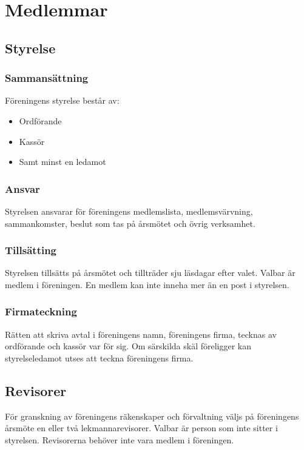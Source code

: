 \section{Medlemmar}

\subsection{Styrelse} \label{sec:sammansättning-styrelse}

\subsubsection{Sammansättning} 
Föreningens styrelse består av:
\begin{itemize}
    \item Ordförande
    \item Kassör
    \item Samt minst en ledamot
\end{itemize}

\subsubsection{Ansvar}
Styrelsen ansvarar för föreningens medlemslista, medlemsvärvning, sammankomster, beslut som tas på årsmötet och övrig verksamhet.

\subsubsection{Tillsätting}
Styrelsen tillsätts på årsmötet och tillträder sju läsdagar efter valet. Valbar är medlem i föreningen. En medlem kan inte inneha mer än en post i styrelsen.

\subsubsection{Firmateckning}
Rätten att skriva avtal i föreningens namn, föreningens firma, tecknas av ordförande och kassör var för sig. Om särskilda skäl föreligger kan styrelseledamot utses att teckna föreningens firma.




\subsection{Revisorer}
För granskning av föreningens räkenskaper och förvaltning väljs på föreningens årsmöte en eller två lekmannarevisorer. Valbar är person som inte sitter i styrelsen. Revisorerna behöver inte vara medlem i föreningen.



